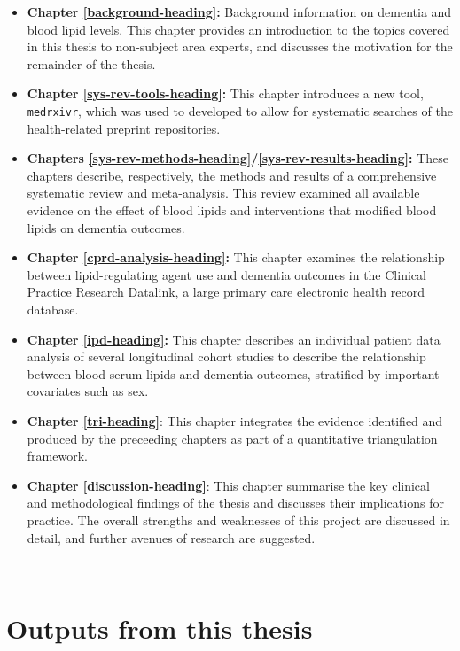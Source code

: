 \documentclass[a4paper, twoside]{templates/ociamthesis}
\providecommand{\tightlist}{%
  \setlength{\itemsep}{0pt}\setlength{\parskip}{0pt}}
\begin{document}
\begin{itemize}
\tightlist
\item
  \textbf{Chapter \ref{background-heading}:} Background information on dementia and blood lipid levels. This chapter provides an introduction to the topics covered in this thesis to non-subject area experts, and discusses the motivation for the remainder of the thesis.
\item
  \textbf{Chapter \ref{sys-rev-tools-heading}:} This chapter introduces a new tool, \texttt{medrxivr}, which was used to developed to allow for systematic searches of the health-related preprint repositories.
\item
  \textbf{Chapters \ref{sys-rev-methods-heading}/\ref{sys-rev-results-heading}:} These chapters describe, respectively, the methods and results of a comprehensive systematic review and meta-analysis. This review examined all available evidence on the effect of blood lipids and interventions that modified blood lipids on dementia outcomes.
\item
  \textbf{Chapter \ref{cprd-analysis-heading}:} This chapter examines the relationship between lipid-regulating agent use and dementia outcomes in the Clinical Practice Research Datalink, a large primary care electronic health record database.
\item
  \textbf{Chapter \ref{ipd-heading}:} This chapter describes an individual patient data analysis of several longitudinal cohort studies to describe the relationship between blood serum lipids and dementia outcomes, stratified by important covariates such as sex.
\item
  \textbf{Chapter \ref{tri-heading}}: This chapter integrates the evidence identified and produced by the preceeding chapters as part of a quantitative triangulation framework.
\item
  \textbf{Chapter \ref{discussion-heading}}: This chapter summarise the key clinical and methodological findings of the thesis and discusses their implications for practice. The overall strengths and weaknesses of this project are discussed in detail, and further avenues of research are suggested.
\end{itemize}

~

\hypertarget{thesis-output}{%
\section{Outputs from this thesis}\label{thesis-output}}
\end{document}
